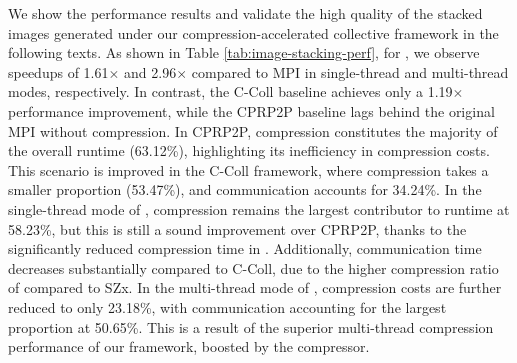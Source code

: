 We show the performance results and validate the high quality of the stacked images generated under our compression-accelerated collective framework in the following texts. As shown in Table \ref{tab:image-stacking-perf}, for {\pname}, we observe speedups of 1.61$\times$ and 2.96$\times$ compared to MPI in single-thread and multi-thread modes, respectively. In contrast, the C-Coll baseline achieves only a 1.19$\times$ performance improvement, while the CPRP2P baseline lags behind the original MPI without compression. In CPRP2P, compression constitutes the majority of the overall runtime (63.12\%), highlighting its inefficiency in compression costs. This scenario is improved in the C-Coll framework, where compression takes a smaller proportion (53.47\%), and communication accounts for 34.24\%. In the single-thread mode of {\pname}, compression remains the largest contributor to runtime at 58.23\%, but this is still a sound improvement over CPRP2P, thanks to the significantly reduced compression time in {\pname}. Additionally, communication time decreases substantially compared to C-Coll, due to the higher compression ratio of {\fzlight} compared to SZx. In the multi-thread mode of {\pname}, compression costs are further reduced to only 23.18\%, with communication accounting for the largest proportion at 50.65\%. This is a result of the superior multi-thread compression performance of our {\pname} framework, boosted by the {\fzlight} compressor.

\begin{table}[]
\caption{Performance comparison and breakdown of image stacking (The speedup is based on MPI. The last four columns are performance breakdowns).}
\label{tab:image-stacking-perf}
\end{table}

